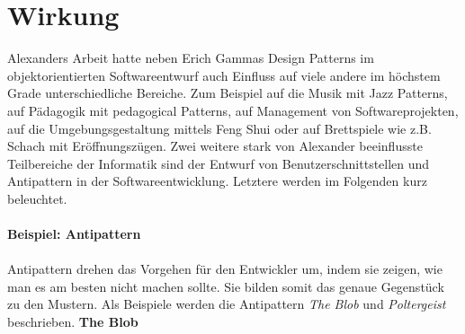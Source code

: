 \documentclass[fontsize=11pt,a4paper,final]{scrreprt}[2003/01/01]
\begin{document}
\section{Wirkung}
Alexanders Arbeit hatte neben Erich Gammas Design Patterns im objektorientierten Softwareentwurf auch Einfluss auf viele andere im höchstem Grade unterschiedliche Bereiche. Zum Beispiel auf die Musik mit Jazz Patterns, auf Pädagogik mit pedagogical Patterns, auf Management von Softwareprojekten, auf die Umgebungsgestaltung mittels Feng Shui oder auf Brettspiele wie z.B. Schach mit Eröffnungszügen. Zwei weitere stark von Alexander beeinflusste Teilbereiche der Informatik sind der Entwurf von Benutzerschnittstellen und Antipattern in der Softwareentwicklung. Letztere werden im Folgenden kurz beleuchtet. \\ \\
\textbf{Beispiel: Antipattern} \\ \\
Antipattern drehen das Vorgehen für den Entwickler um, indem sie zeigen, wie man es am besten nicht machen sollte. Sie bilden somit das genaue Gegenstück zu den Mustern. Als Beispiele werden die Antipattern \textit{The Blob} und \textit{Poltergeist} beschrieben. \newpage
\textbf{The Blob \cite[S. 42 - 48]{Brown1998}}
\end{document}
